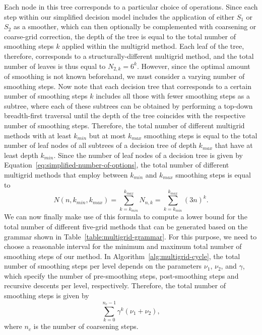 Each node in this tree corresponds to a particular choice of operations.
Since each step within our simplified decision model includes the application of either $S_1$ or $S_2$ as a smoother, which can then optionally be complemented with coarsening or coarse-grid correction, the depth of the tree is equal to the total number of smoothing steps $k$ applied within the multigrid method.
Each leaf of the tree, therefore, corresponds to a structurally-different multigrid method, and the total number of leaves is thus equal to $N_{2,k} = 6^k$.
However, since the optimal amount of smoothing is not known beforehand, we must consider a varying number of smoothing steps.
Now note that each decision tree that corresponds to a certain number of smoothing steps $k$ includes all those with fewer smoothing steps as a subtree, where each of these subtrees can be obtained by performing a top-down breadth-first traversal until the depth of the tree coincides with the respective number of smoothing steps.
Therefore, the total number of different multigrid methods with at least $k_{min}$ but at most $k_{max}$ smoothing steps is equal to the total number of leaf nodes of all subtrees of a decision tree of depth $k_{max}$ that have at least depth $k_{min}$.
Since the number of leaf nodes of a decision tree is given by Equation~\ref{eq:simplified-number-of-options}, the total number of different multigrid methods that employ between $k_{min}$ and $k_{max}$ smoothing steps is equal to
\begin{equation}
	N(n, k_{min}, k_{max}) = \sum_{k = k_{min}}^{k_{max}} N_{n,k} = \sum_{k = k_{min}}^{k_{max}} (3 n)^k.
	\label{eq:search-space-estimation}
\end{equation}
We can now finally make use of this formula to compute a lower bound for the total number of different five-grid methods that can be generated based on the grammar shown in Table~\ref{table:multigrid-grammar}.
For this purpose, we need to choose a reasonable interval for the minimum and maximum total number of smoothing steps of our method.
In Algorithm~\ref{alg:multigrid-cycle}, the total number of smoothing steps per level depends on the parameters $\nu_1$, $\nu_2$, and $\gamma$, which specify the number of pre-smoothing steps, post-smoothing steps and recursive descents per level, respectively.
Therefore, the total number of smoothing steps is given by
\begin{equation*}
	\sum_{k = 0}^{n_c - 1} \gamma^k (\nu_1 + \nu_2),
\end{equation*}
where $n_c$ is the number of coarsening steps.
